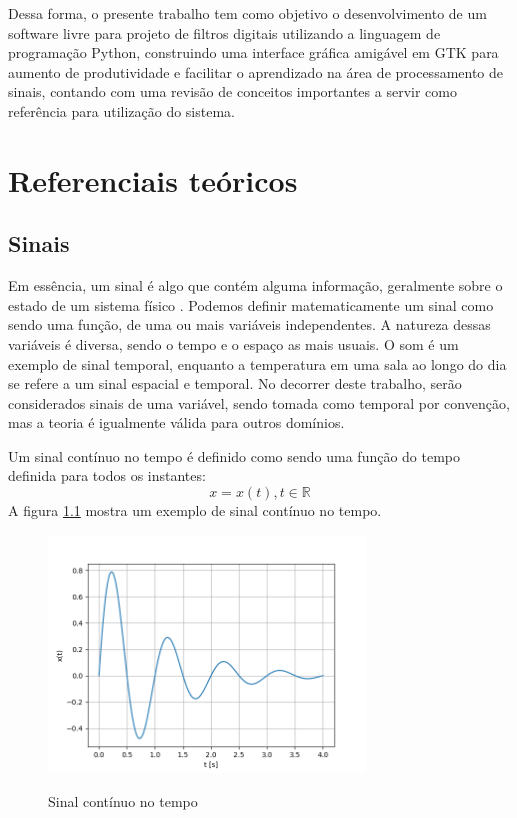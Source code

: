 \documentclass[12pt,a4paper]{report}
\begin{document}
  Dessa forma, o presente trabalho tem como objetivo o desenvolvimento de um software livre para projeto de
  filtros digitais utilizando a linguagem de programação Python, construindo uma interface gráfica amigável em
  GTK para aumento de produtividade e facilitar o aprendizado na área de processamento de sinais, contando com
  uma revisão de conceitos importantes a servir como referência para utilização do sistema.
\chapter{Referenciais teóricos}
\section{Sinais}
  Em essência, um sinal é algo que contém alguma informação, geralmente sobre o estado de um sistema físico
  \cite{oppenheim}. Podemos definir matematicamente um sinal como sendo uma função, de uma ou mais variáveis
  independentes. A natureza dessas variáveis é diversa, sendo o tempo e o espaço as mais usuais. O som é um
  exemplo de sinal temporal, enquanto a temperatura em uma sala ao longo do dia se refere a um sinal espacial e
  temporal. No decorrer deste trabalho, serão considerados sinais de uma variável, sendo tomada como temporal
  por convenção, mas a teoria é igualmente válida para outros domínios.

  Um sinal contínuo no tempo é definido como sendo uma função do tempo definida para todos os instantes:
  \begin{equation}
    x = x(t), t \in \mathbb{R}
  \end{equation}
  A figura \ref{fig:continuous} mostra um exemplo de sinal contínuo no tempo.
  \begin{figure}
    \caption{Sinal contínuo no tempo}
    \centering
    \includegraphics[width=0.75\textwidth]{continuous}
    \label{fig:continuous}
  \end{figure}
\end{document}
